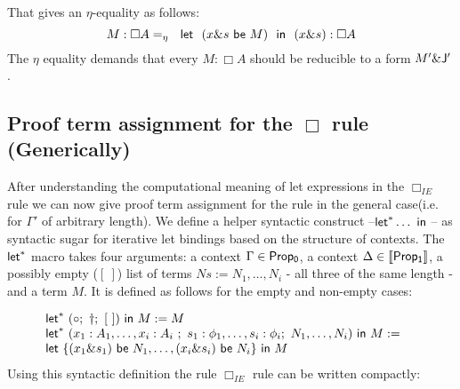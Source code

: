         That gives an $\eta$-equality as follows:
        {\small
            $$M:\Box A =_{\eta}\ \ {\sf let} \ \ (x \& s\  {\sf be} \ M)\ \ {\sf in}\ \  { (x \& s)}:\Box A$$
        }
        The $\eta$ equality demands that every $M:\Box A$ should be reducible to a form $M'\& {\sf J^{\prime}}$.  
        \subsection{Proof term assignment for the $\Box$ rule (Generically)}
        After understanding the computational meaning of let expressions in the $\Box_{IE}$ rule 
        we can now give  proof term assignment  for the rule in the general case(i.e. for $\Gamma'$ of arbitrary length). 
        We define a helper syntactic construct --${\sf let}^{*}\ldots {\ \sf in\ }$-- as syntactic sugar for iterative  let bindings based on the structure  of contexts.
        The ${\sf let}^{*}$ macro takes four arguments: a context $\Gamma\in {\sf Prop_0}$, a  context $\Delta\in{\sf \llbracket Prop_1\rrbracket}$,  
        a possibly empty ($[\ ]$) list of terms  $Ns:=N_1,\ldots,  N_i$ - all three of the same length - and a term $M$. It is defined as follows for the empty and non-empty cases:
        
        {\small
            $$\begin{array}{ll}
            \nonumber {\sf let}^{*}\ (\circ;\ \dagger;\  [\ ]) {\ \sf in\ }  M:= M \  &\\
            \nonumber {\sf let}^{*}\ (x_1:A_1,\ldots, x_i:A_i\ ;\  s_1: \phi_1, \ldots, s_i:\phi_i;\  N_1,\ldots,  N_i) {\ \sf in\ } M:= \  & \\
            {\sf let} \ \{(x_1 \& s_1)\  {\sf be}\  N_1,\ldots,  (x_i \& s_i)\  {\sf be}\  N_i\}\ {\sf in}\  M &\\
            \end{array}$$}
        Using this syntactic definition the rule $\Box_{IE}$ rule  can be written compactly:
        
